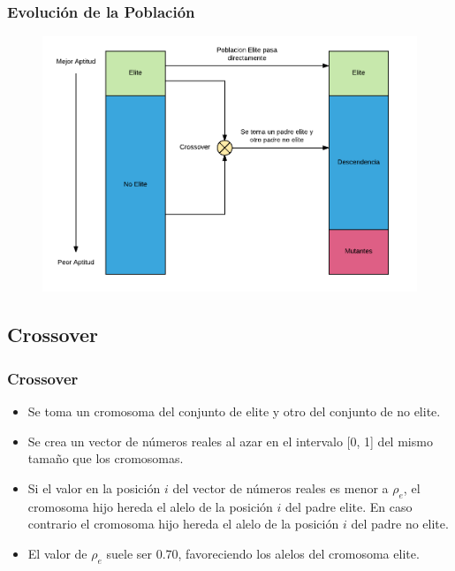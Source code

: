 \documentclass{beamer}
\begin{document}
\begin{frame}
\frametitle{Evolución de la Población}

\begin{figure}[h]
	\centering
	\includegraphics[width=12cm]{EvolucionPoblacion}
	\label{fig:EvolucionPoblacion}
\end{figure}

\end{frame}


\subsection{Crossover}

\begin{frame}
\frametitle{Crossover}

\begin{itemize}
    \item Se toma un cromosoma del conjunto de elite y otro del conjunto de no elite.
    \pause
    \item Se crea un vector de números reales al azar en el intervalo [0, 1] del mismo tamaño que los cromosomas.
    \pause
    \item Si el valor en la posición $i$ del vector de números reales es menor a $\rho_e$, el cromosoma hijo hereda el alelo de la posición $i$ del padre elite. En caso contrario el cromosoma hijo hereda el alelo de la posición $i$ del padre no elite.
    \pause
    \item El valor de $\rho_e$ suele ser $0.70$, favoreciendo los alelos del cromosoma elite.
    \pause
\end{itemize}

\end{frame}
\end{document}
